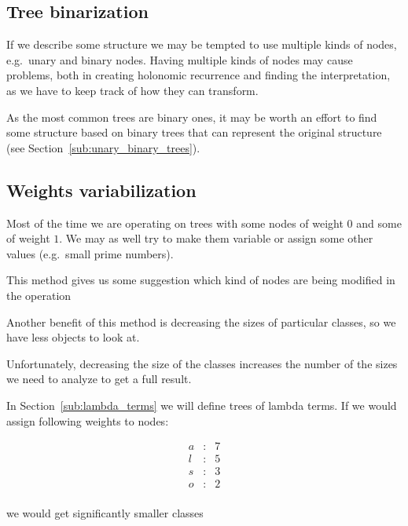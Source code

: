 \documentclass[final]{article}
\theoremstyle{definition}
\theoremstyle{definition}
\theoremstyle{remark}
\begin{document}
\subsection{Tree binarization}%
\label{sub:tree_binarization}

If we describe some structure we may be tempted to use multiple kinds of nodes, e.g.~unary and binary nodes. Having multiple kinds of nodes may cause problems, both in creating holonomic recurrence and finding the interpretation, as we have to keep track of how they can transform.

As the most common trees are binary ones, it may be worth an effort to find some structure based on binary trees that can represent the original structure (see Section~\ref{sub:unary_binary_trees}).

\subsection{Weights variabilization}%
\label{sub:weights_variablization}

Most of the time we are operating on trees with some nodes of weight \(0\) and some of weight \(1\). We may as well try to make them variable or assign some other values (e.g.\ small prime numbers).

This method gives us some suggestion which kind of nodes are being modified in the operation

Another benefit of this method is decreasing the sizes of particular classes, so we have less objects to look at.

Unfortunately, decreasing the size of the classes increases the number of the sizes we need to analyze to get a full result.

In Section~\ref{sub:lambda_terms} we will define trees of lambda terms. If we would assign following weights to nodes:

\[\begin{array}{rcl}
        a &:& 7\\
        l &:& 5\\
        s &:& 3\\
        o &:& 2\\
\end{array}\]

we would get significantly smaller classes
\end{document}
